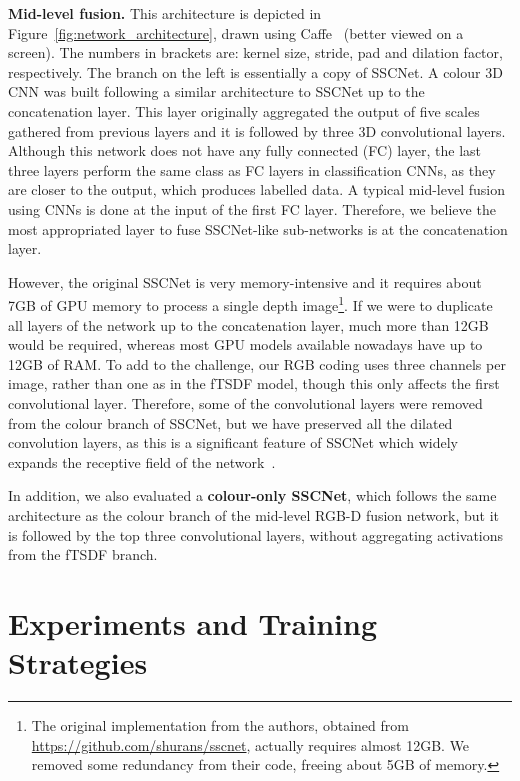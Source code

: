{\bf Mid-level fusion.}
This architecture is depicted in 
Figure~\ref{fig:network_architecture}, drawn using
Caffe~\cite{jia_etal_Caffe_arXiv2014} (better viewed
on a screen).
The numbers in brackets are: kernel size,
stride, pad and dilation factor, respectively.
The branch on the left is essentially a copy of
SSCNet. A colour 3D CNN was built following a similar architecture
to SSCNet up to the concatenation layer.
This
layer originally aggregated the output of five scales gathered
from  previous layers and it is followed by three 3D convolutional
layers.
Although this network does not have any fully connected (FC)
layer, the last three layers perform the same class as FC layers
in classification CNNs, as they are closer to the output, which
produces labelled data. A typical
mid-level fusion using CNNs is done at the input of the
first FC layer. Therefore, we believe the most appropriated
layer to fuse SSCNet-like sub-networks is at the concatenation layer.

However, the original SSCNet is very memory-intensive
and it requires about 7GB of GPU memory to process
a single depth image\footnote{The original implementation from
  the authors, obtained from \url{https://github.com/shurans/sscnet},
  actually requires almost 12GB. We removed some redundancy from
  their code, freeing about 5GB of memory.}. 
If we were to duplicate all layers of the network up to the
concatenation layer, much more than 12GB would be required,
whereas most GPU models available nowadays have up to 12GB
of RAM.
To add to the challenge, our RGB coding uses three
channels per image, rather than one as in the fTSDF model,
though this only affects the first convolutional layer.
Therefore, some of the convolutional layers were removed
from the colour branch of SSCNet, but we have preserved all the
dilated convolution layers, as this is a significant
feature of SSCNet which widely expands the receptive
field of the network~\cite{yu_koltun_DilatedConv_iclr2016}.

In addition, we also evaluated a {\bf colour-only SSCNet},
which follows the same architecture as the colour branch of the
mid-level RGB-D fusion network, but it is followed by the
top three convolutional layers, without aggregating
activations from the fTSDF branch.



\section{Experiments and Training Strategies}

